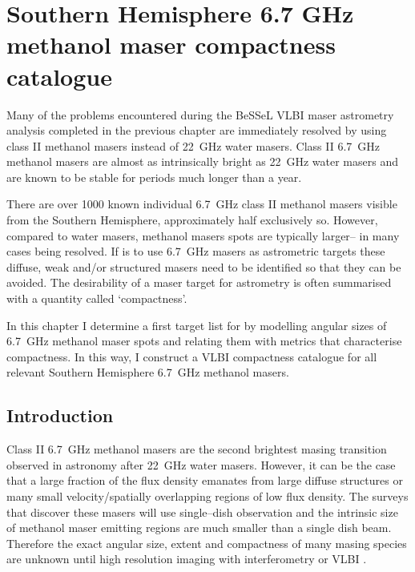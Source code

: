 \chapter{Southern Hemisphere 6.7 GHz methanol maser compactness catalogue}\label{chap:chapter4}
	\onehalfspacing

    \vspace{3cm}
	Many of the problems encountered during the BeSSeL VLBI maser astrometry analysis completed in the previous chapter are immediately resolved by using class II methanol masers instead of 22~GHz water masers. Class II 6.7~GHz methanol masers are almost as intrinsically bright as 22~GHz water masers and are known to be stable for periods much longer than a year.
	
	There are over 1000 known individual 6.7~GHz class II methanol masers visible from the Southern Hemisphere, approximately half exclusively so.  However, compared to water masers, methanol masers spots are typically larger-- in many cases being resolved. If \spirals\space is to use 6.7~GHz masers as astrometric targets these diffuse, weak and/or structured masers need to be identified so that they can be avoided. The desirability of a maser target for astrometry is often summarised with a quantity called `compactness'. 
	
	In this chapter I determine a first target list for \spirals by modelling angular sizes of 6.7~GHz methanol maser spots and relating them with metrics that characterise compactness. In this way, I construct a VLBI compactness catalogue for all relevant Southern Hemisphere 6.7~GHz methanol masers.
	
	\singlespacing

\newpage
\section{Introduction}
	Class II 6.7~GHz methanol masers are the second brightest masing transition observed in astronomy after 22~GHz water masers. However, it can be the case that a large fraction of the flux density emanates from large diffuse structures \citep[$>0.1-1.5$~as at a distance of 4~kpc; ][]{Caswell1997} or many small velocity/spatially overlapping regions of low flux density. The surveys that discover these masers \citep[e.g. ][ etc]{Caswell2010} will use single--dish observation and the intrinsic size of methanol maser emitting regions are much smaller than a single dish beam. Therefore the exact angular size, extent and compactness of many masing species are unknown until high resolution imaging with interferometry \citep[e.g. ][]{Phillips1998} or VLBI \citep[e.g. ][]{Minier2002,Goehart2005,Bartkewicz2009}.
	
